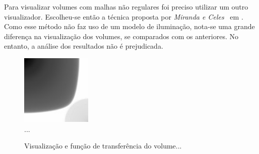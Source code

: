 	Para visualizar volumes com malhas não regulares foi preciso utilizar um outro visualizador. Escolheu-se então a técnica proposta por \textit{Miranda e Celes}~\cite{miranda} em . Como esse método não faz uso de um modelo de iluminação, nota-se uma grande diferença na visualização dos volumes, se comparados com os anteriores. No entanto, a análise dos resultados não é prejudicada.
	
\begin{figure}[h]
	\centering
	\includegraphics[width=0.3\textwidth]{images/r_vrep_so_slice}
	\caption{...}
\end{figure}

\begin{figure}[h]
	\centering
	\caption{Visualização e função de transferência do volume...}
	\label{fig:r_vrep}
\end{figure}

